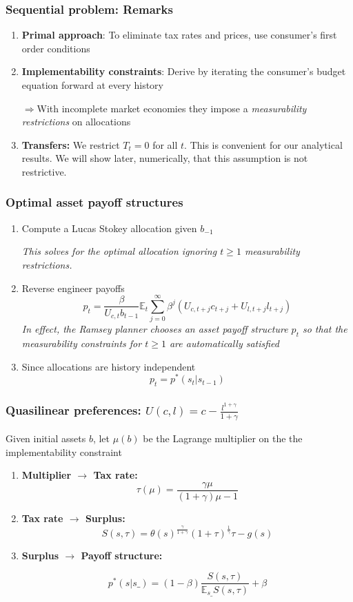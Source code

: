 \documentclass{beamer}
\newcommand{\EE}{\mathbb E}
\begin{document}
  \begin{frame}
  \frametitle{Sequential problem: Remarks}
  \begin{enumerate}
  \item \textbf{Primal approach}: To eliminate tax rates and prices, use  consumer's first order conditions
  \item \textbf{Implementability constraints}:  Derive by iterating the consumer's budget equation forward  at every history

  $\Rightarrow$With incomplete market economies they impose a \emph{measurability restrictions} on allocations

  \item  \textbf{Transfers: } We restrict $T_t = 0$ for all $t$. This is convenient for our analytical results.  We will show later, numerically, that this assumption is not restrictive.

  \end{enumerate}


  \end{frame}

 \begin{frame}
\frametitle{Optimal asset payoff structures}
\begin{enumerate}
 \item Compute a Lucas Stokey allocation given $b_{-1}$

 \emph{ This solves for the optimal allocation ignoring $t\geq1$ measurability restrictions.}

 \item Reverse engineer payoffs
\[
	p_t = \frac{\beta}{U_{c,t}b_{t-1}}\EE_t\sum_{j=0}^\infty\beta^j\left(U_{c,t+j}c_{t+j}+U_{l,t+j}l_{t+j}\right)
\]
\emph{In effect,  the Ramsey planner chooses an asset payoff structure $p_t$  so that  the measurability constraints for $t\geq 1$ are automatically satisfied}
\item Since allocations are history independent
\[p_t=p^*(s_t|s_{t-1})\]
\end{enumerate}
\end{frame}

\begin{frame}
\frametitle{Quasilinear preferences: $U(c,l)=c-\frac{l^{1+\gamma}}{1+\gamma}$}
Given initial assets $b$,  let $\mu(b)$ be the Lagrange multiplier on the  the implementability constraint
\begin{enumerate}

 \item \textbf{Multiplier $\to$ Tax rate:}
 \[
		\tau(\mu) = \frac{\gamma\mu}{(1+\gamma)\mu-1}
	\]
 \item \textbf{Tax rate $\to$ Surplus:}
 \[
		S(s,\tau) = \theta(s)^\frac\gamma{1+\gamma}(1+\tau)^\frac1\gamma\tau-g(s)
	\]
\item \textbf{Surplus $\to$ Payoff structure:}

\[
 p^*(s|s\_) = (1-\beta)\frac{S(s,\tau)}{\EE_{s\_} S(s,\tau)} + \beta
 \]

 \end{enumerate}

\end{frame}
\end{document}
